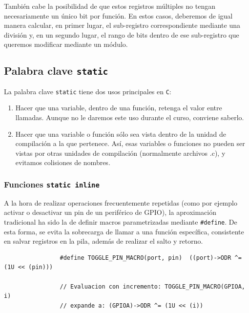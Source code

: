 \documentclass[../main.tex]{subfiles}
\begin{document}
        También cabe la posibilidad de que estos registros múltiples no tengan necesariamente un único bit por función. En estos casos, deberemos de igual manera calcular, en primer lugar, el sub-registro correspondiente mediante una división y, en un segundo lugar, el rango de bits dentro de ese sub-registro que queremos modificar mediante un módulo. 

    \subsection{Palabra clave \lstinline|static|}
        
        La palabra clave \lstinline|static| tiene dos usos principales en \texttt{C}:

        \begin{enumerate}
            \item Hacer que una variable, dentro de una función, retenga el valor entre llamadas. Aunque no le daremos este uso durante el curso, conviene saberlo.
            \item Hacer que una variable o función sólo sea vista dentro de la unidad de compilación a la que pertenece. Así, esas variables o funciones no pueden ser vistas por otras unidades de compilación (normalmente archivos .c), y evitamos colisiones de nombres.
        \end{enumerate}

        \subsubsection{Funciones \lstinline|static inline|}

            A la hora de realizar operaciones frecuentemente repetidas (como por ejemplo activar o desactivar un pin de un periférico de GPIO), la aproximación tradicional ha sido la de definir macros parametrizadas mediante \lstinline|#define|. De esta forma, se evita la sobrecarga de llamar a una función específica, consistente en salvar registros en la pila, además de realizar el salto y retorno.

            \begin{lstlisting}
                #define TOGGLE_PIN_MACRO(port, pin)  ((port)->ODR ^= (1U << (pin)))

                // Evaluacion con incremento: TOGGLE_PIN_MACRO(GPIOA, i) 
                // expande a: (GPIOA)->ODR ^= (1U << (i))
            \end{lstlisting}
\end{document}
